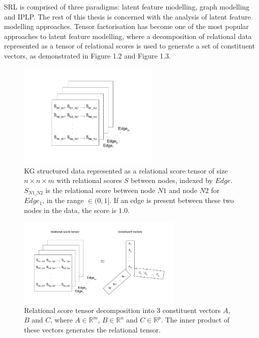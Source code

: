 \noindent SRL is comprised of three paradigms: latent feature modelling, graph modelling and IPLP. The rest of this thesis is concerned with the analysis of latent feature modelling approaches. Tensor factorisation has become one of the most popular approaches to latent feature modelling, where a decomposition of relational data represented as a tensor of relational scores is used to generate a set of constituent vectors, as demonstrated in Figure 1.2 and Figure 1.3. \par

\begin{figure}[H]
   	\centering
    	\includegraphics[width=0.6\textwidth, height=0.3\textheight]{relational_tensor.png}
	\captionsetup{justification=centering}
	\caption{KG structured data represented as a relational score tensor of size $ n \times n \times m $ with relational scores $ S $ between nodes, indexed by $ Edge $. $ S_{N1\_N2} $ is the relational score between node $ N1 $ and node $ N2 $ for $ Edge_1 $, in the range $ \in (0, 1] $. If an edge is present between these two nodes in the data, the score is $ 1.0 $.}
\end{figure}

\begin{figure}[H]
   	\centering
    	\includegraphics[width=0.7\textwidth, height=0.4\textwidth]{relational_tensor_decomposition}
	\captionsetup{justification=centering}
	\caption{Relational score tensor decomposition into $ 3 $ constituent vectors $ A $, $ B $ and $ C $, where $ A \in \mathbb{R}^m $,  $ B \in \mathbb{R}^n $ and $ C \in \mathbb{R}^p $. The inner product of these vectors generates the relational tensor.}
\end{figure}

